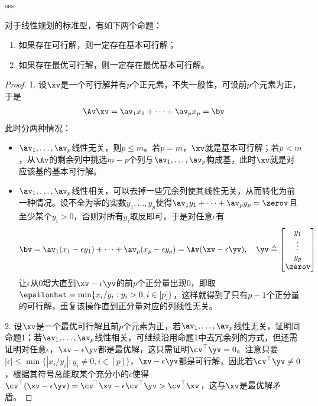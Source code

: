 \documentclass{ctexart}
\begin{document}
\begin{example}
    sss
\end{example}

\begin{theorem} [线性规划基本定理]
    对于线性规划的标准型，有如下两个命题：
    \begin{enumerate}
        \item 如果存在可行解，则一定存在基本可行解；
        \item 如果存在最优可行解，则一定存在最优基本可行解。
    \end{enumerate}
\end{theorem}

\begin{proof}
    1. 设$\xv$是一个可行解并有$p$个正元素，不失一般性，可设前$p$个元素为正，于是
    \begin{align*}
        \Av \xv = \av_1 x_1 + \cdots + \av_p x_p = \bv
    \end{align*}
    此时分两种情况：
    \begin{itemize}
        \item $\av_1, \ldots, \av_p$线性无关，则$p \le m$。若$p = m$，$\xv$就是基本可行解；若$p < m$，从$\Av$的剩余列中挑选$m-p$个列与$\av_1, \ldots, \av_p$构成基，此时$\xv$就是对应该基的基本可行解。
        \item $\av_1, \ldots, \av_p$线性相关，可以去掉一些冗余列使其线性无关，从而转化为前一种情况。设不全为零的实数$y_1, \ldots, y_p$使得$\av_1 y_1 + \cdots + \av_p y_p = \zerov$且至少某个$y_i > 0$，否则对所有$y_i$取反即可，于是对任意$\epsilon$有
              \begin{align*}
                  \bv = \av_1 (x_1 - \epsilon y_1) + \cdots + \av_p (x_p - \epsilon y_p) = \Av (\xv - \epsilon \yv), \quad
                  \yv \triangleq \begin{bmatrix}
                                     y_1 \\ \vdots \\ y_p \\ \zerov
                                 \end{bmatrix}
              \end{align*}
              让$\epsilon$从$0$增大直到$\xv - \epsilon \yv$的前$p$个正分量出现$0$，即取$\epsilonhat = \min\{ x_i / y_i: y_i > 0, i \in [p] \}$，这样就得到了只有$p-1$个正分量的可行解，重复该操作直到正分量对应的列线性无关。
    \end{itemize}

    2. 设$\xv$是一个最优可行解且前$p$个元素为正，若$\av_1, \ldots, \av_p$线性无关，证明同命题1；若$\av_1, \ldots, \av_p$线性相关，可继续沿用命题1中去冗余列的方式，但还需证明对任意$\epsilon$，$\xv - \epsilon \yv$都是最优解，这只需证明$\cv^\top \yv = 0$。注意只要$|\epsilon| \le \min\{ | x_i / y_i |: y_i \ne 0, i \in [p] \}$，$\xv - \epsilon \yv$都是可行解，因此若$\cv^\top \yv \ne 0$，根据其符号总能取某个充分小的$\epsilon$使得$\cv^\top (\xv - \epsilon \yv) = \cv^\top \xv - \epsilon \cv^\top \yv > \cv^\top \xv$，这与$\xv$是最优解矛盾。
\end{proof}
\end{document}
